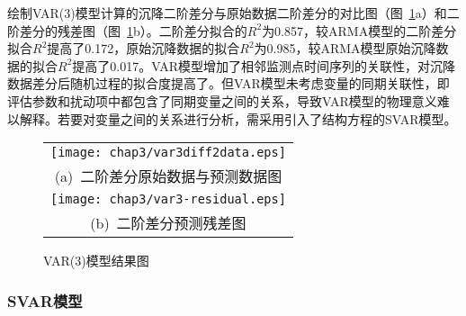 绘制VAR(3)模型计算的沉降二阶差分与原始数据二阶差分的对比图（图~\ref{fig:VAR3模型结果图}a）和二阶差分的残差图（图~\ref{fig:VAR3模型结果图}b）。二阶差分拟合的$R^2$为0.857，较ARMA模型的二阶差分拟合$R^2$提高了0.172，原始沉降数据的拟合$R^2$为0.985，较ARMA模型原始沉降数据的拟合$R^2$提高了0.017。VAR模型增加了相邻监测点时间序列的关联性，对沉降数据差分后随机过程的拟合度提高了。但VAR模型未考虑变量的同期关联性，即评估参数和扰动项中都包含了同期变量之间的关系，导致VAR模型的物理意义难以解释。若要对变量之间的关系进行分析，需采用引入了结构方程的SVAR模型。

\begin{figure}[htb!] 
    \centering 
    \begin{tabular}{c} 
        \texttt{[image: chap3/var3diff2data.eps]} \\ 
        (a)~二阶差分原始数据与预测数据图 \\
        \texttt{[image: chap3/var3-residual.eps]} \\ 
        (b)~二阶差分预测残差图 \\
    \end{tabular}
    \caption{VAR(3)模型结果图} 
    \label{fig:VAR3模型结果图} 
\end{figure}

\subsubsection{SVAR模型}

